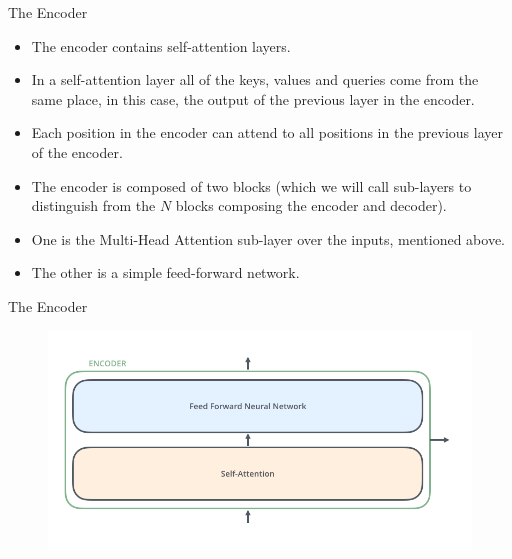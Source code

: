 \documentclass[handout]{beamer}
\begin{document}
\begin{frame}{The Encoder}
\begin{scriptsize}
\begin{itemize}

\item The encoder contains self-attention layers. 

\item In a self-attention layer all of the keys, values and queries come from the same place, in this case, the output of the previous layer in the encoder. 

\item Each position in the encoder can attend to all positions in the previous layer of the encoder.

 \item  The encoder is composed of two blocks (which we will call sub-layers to distinguish from the $N$ blocks composing the encoder and decoder).
\item  One is the Multi-Head Attention sub-layer over the inputs, mentioned above. 
\item The other is a simple feed-forward network. 

\end{itemize}

\end{scriptsize}


    


\end{frame}



\begin{frame}{The Encoder}



     \begin{figure}[h]
        	\includegraphics[scale = 0.35]{pics/Transformer_encoder.png}
        \end{figure}  





\end{frame}
\end{document}

